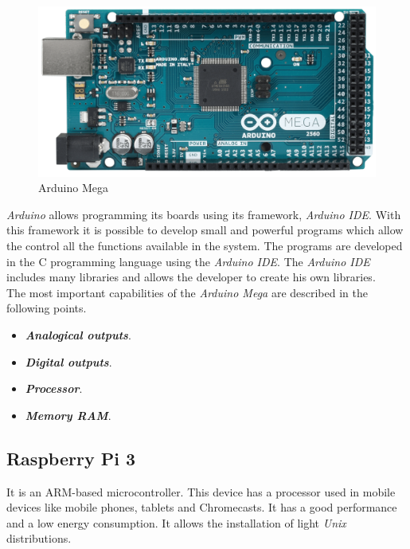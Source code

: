 \begin{figure}[H]
\begin{centering}
\includegraphics[scale=0.08]{IMGS/ARDUINO_MEGA.png}
\caption{Arduino Mega \label{Arduino_Mega}}
\end{centering}
\end{figure}

\textit{Arduino} allows programming its boards using its framework, \textit{Arduino IDE}. With this framework it is possible to develop small and powerful programs which allow the control all the functions available in the system. The programs are developed in the C programming language using the \textit{Arduino IDE}. The \textit{Arduino IDE} includes many libraries and allows the developer to create his own libraries.\\

The most important capabilities of the \textit{Arduino Mega} are described in the following points.

\begin{itemize}

\item \textbf{\textit{Analogical outputs}}.

\item \textbf{\textit{Digital outputs}}.

\item \textbf{\textit{Processor}}.

\item \textbf{\textit{Memory RAM}}.

\end{itemize}

\subsection{Raspberry Pi 3}

It is an ARM-based microcontroller. This device has a processor used in mobile devices like mobile phones, tablets and Chromecasts. It has a good performance and a low energy consumption. It allows the installation of light \textit{Unix} distributions.
	
